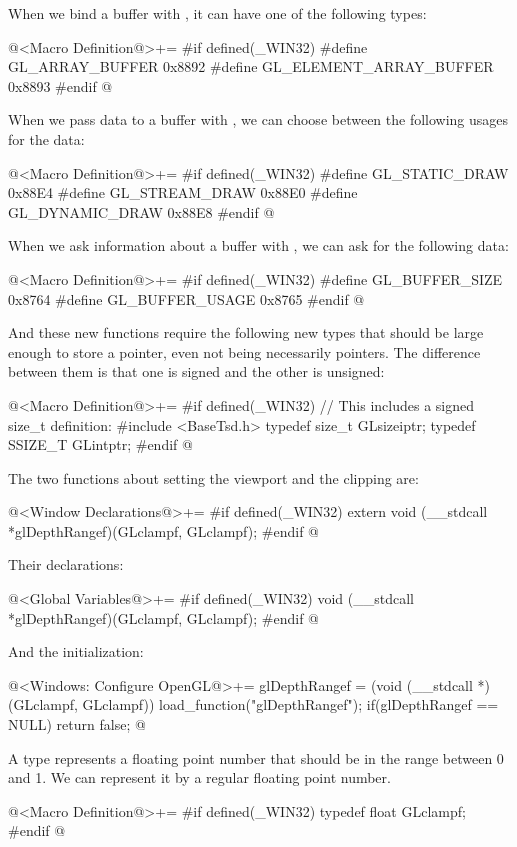 When we bind a buffer with , it can have one
of the following types:

\iniciocodigo
@<Macro Definition@>+=
#if defined(_WIN32)
#define GL_ARRAY_BUFFER         0x8892
#define GL_ELEMENT_ARRAY_BUFFER 0x8893
#endif
@
\fimcodigo

When we pass data to a buffer with , we can
choose between the following usages for the data:

\iniciocodigo
@<Macro Definition@>+=
#if defined(_WIN32)
#define GL_STATIC_DRAW  0x88E4
#define GL_STREAM_DRAW  0x88E0
#define GL_DYNAMIC_DRAW 0x88E8
#endif
@
\fimcodigo

When we ask information about a buffer
with , we can ask for the following
data:

\iniciocodigo
@<Macro Definition@>+=
#if defined(_WIN32)
#define GL_BUFFER_SIZE  0x8764
#define GL_BUFFER_USAGE 0x8765
#endif
@
\fimcodigo

And these new functions require the following new types that should be
large enough to store a pointer, even not being necessarily
pointers. The difference between them is that one is signed and the
other is unsigned:

\iniciocodigo
@<Macro Definition@>+=
#if defined(_WIN32)
// This includes a signed size_t definition:
#include <BaseTsd.h>
typedef size_t GLsizeiptr;
typedef SSIZE_T GLintptr;
#endif
@
\fimcodigo

The two functions about setting the viewport and the clipping are:

\iniciocodigo
@<Window Declarations@>+=
#if defined(_WIN32)
extern void (__stdcall *glDepthRangef)(GLclampf, GLclampf);
#endif
@
\fimcodigo

Their declarations:

\iniciocodigo
@<Global Variables@>+=
#if defined(_WIN32)
void (__stdcall *glDepthRangef)(GLclampf, GLclampf);
#endif
@
\fimcodigo

And the initialization:

\iniciocodigo
@<Windows: Configure OpenGL@>+=
glDepthRangef = (void (__stdcall *)(GLclampf, GLclampf))
                   load_function("glDepthRangef");
if(glDepthRangef == NULL) return false;
@
\fimcodigo

A type  represents a floating point number that
should be in the range between 0 and 1. We can represent it by a
regular floating point number.

\iniciocodigo
@<Macro Definition@>+=
#if defined(_WIN32)
typedef float GLclampf;
#endif
@
\fimcodigo

